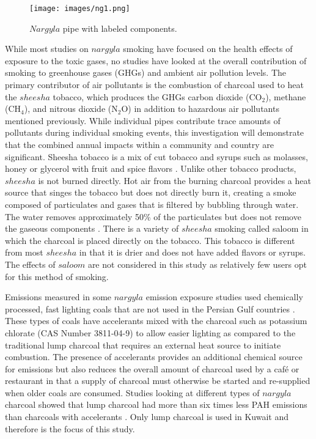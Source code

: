 %
\begin{figure}[H]
\texttt{[image: images/ng1.png]} 
\caption{$Nargyla$ pipe with labeled components.}
\label{figng1:pipe}
\end{figure}
%
While most studies on $nargyla$ smoking have focused on the health effects of exposure to the toxic gases, no studies have looked at the overall contribution of smoking to greenhouse gases (GHGs) and ambient air pollution levels.  The primary contributor of air pollutants is the combustion of charcoal used to heat the $sheesha$ tobacco, which produces the GHGs carbon dioxide (CO$_{2}$), methane (CH$_{4}$), and nitrous dioxide (N$_{2}$O) in addition to hazardous air pollutants mentioned previously.  While individual pipes contribute trace amounts of pollutants during individual smoking events, this investigation will demonstrate that the combined annual impacts within a community and country are significant.
Sheesha tobacco is a mix of cut tobacco and syrups such as molasses, honey or glycerol with fruit and spice flavors \citep{Chaouachi2009}.  Unlike other tobacco products, $sheesha$ is not burned directly. Hot air from the burning charcoal provides a heat source that singes the tobacco but does not directly burn it, creating a smoke composed of particulates and gases \citep{Daher2010} that is filtered by bubbling through water.  The water removes approximately 50\% of the particulates but does not remove the gaseous components \citep{Becquemin2008}. There is a variety of $sheesha$ smoking called saloom in which the charcoal is placed directly on the tobacco. This tobacco is different from most $sheesha$ in that it is drier and does not have added flavors or syrups. The effects of $saloom$ are not considered in this study as relatively few users opt for this method of smoking.

Emissions measured in some $nargyla$ emission exposure studies used chemically processed, fast lighting coals that are not used in the Persian Gulf countries \citep{Daher2010, Shihadeh2005}.  These types of coals have accelerants mixed with the charcoal such as potassium chlorate (CAS Number 3811-04-9) \citep{MIC2012} to allow easier lighting as compared to the traditional lump charcoal that requires an external heat source to initiate combustion.  The presence of accelerants provides an additional chemical source for emissions but also reduces the overall amount of charcoal used by a caf\'e or restaurant in that a supply of charcoal must otherwise be started and re-supplied when older coals are consumed. Studies looking at different types of $nargyla$ charcoal showed that lump charcoal had more than six times less PAH emissions than charcoals with accelerants \citep{Sepetdjian2010}.  Only lump charcoal is used in Kuwait and therefore is the focus of this study.

